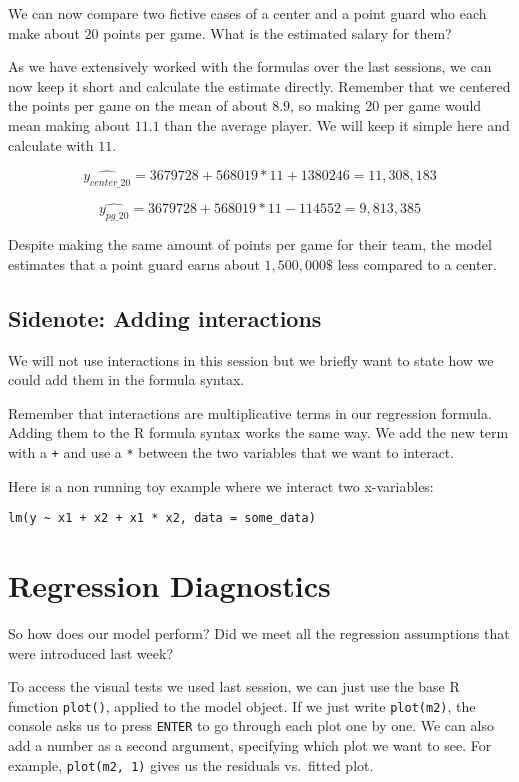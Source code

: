 \documentclass[
]{book}
\begin{document}
We can now compare two fictive cases of a center and a point guard who each make
about \(20\) points per game. What is the estimated salary for them?

As we have extensively worked with the formulas over the last sessions, we can
now keep it short and calculate the estimate directly. Remember that we
centered the points per game on the mean of about \(8.9\), so making \(20\) per game
would mean making about \(11.1\) than the average player. We will keep it simple
here and calculate with \(11\).

\[\hat{y_{center\_20}} = 3679728 + 568019 * 11 + 1380246 = 11,308,183\]

\[\hat{y_{pg\_20}} = 3679728 + 568019 * 11 - 114552 = 9,813,385\]

Despite making the same amount of points per game for their team, the model
estimates that a point guard earns about \(1,500,000\$\) less compared to a center.

\hypertarget{sidenote-adding-interactions}{%
\subsection{Sidenote: Adding interactions}\label{sidenote-adding-interactions}}

We will not use interactions in this session but we briefly want to state how we
could add them in the formula syntax.

Remember that interactions are multiplicative terms in our regression formula.
Adding them to the R formula syntax works the same way. We add the new term with
a \texttt{+} and use a \texttt{*} between the two variables that we want to interact.

Here is a non running toy example where we interact two x-variables:

\begin{verbatim}
lm(y ~ x1 + x2 + x1 * x2, data = some_data)
\end{verbatim}

\hypertarget{regression-diagnostics-1}{%
\section{Regression Diagnostics}\label{regression-diagnostics-1}}

So how does our model perform? Did we meet all the regression assumptions that
were introduced last week?

To access the visual tests we used last session, we can just use the base R
function \texttt{plot()}, applied to the model object. If we just write \texttt{plot(m2)}, the
console asks us to press \texttt{ENTER} to go through each plot one by one. We can also
add a number as a second argument, specifying which plot we want to see. For
example, \texttt{plot(m2,\ 1)} gives us the residuals vs.~fitted plot.
\end{document}
